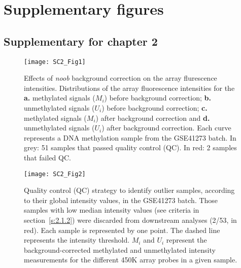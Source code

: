 
\setcounter{chapter}{-1}

\chapter[]{Supplementary figures} 

\ifpdf
\graphicspath{{Appendix/Figs/pdf/}}
\else
\graphicspath{{Appendix/Figs/svg/}}
\fi

\renewcommand{\thesection}{S.1}   
\section{Supplementary for chapter 2}

\renewcommand\thefigure{S1.\arabic{figure}}    

\begin{figure}[htbp!] 
	\centering    
	\setcounter{figure}{0}
	\texttt{[image: SC2\_Fig1]}
	\caption[Effects of \textit{noob} background correction on the array fluorescence intensities.]{Effects of \textit{noob} background correction on the array flurescence intensities. Distributions of the array fluorescence intensities for the \textbf{a.} methylated signals ($M_{i}$) before background correction; \textbf{b.} unmethylated signals ($U_{i}$) before background correction; \textbf{c.} methylated signals ($M_{i}$) after background correction and \textbf{d.} unmethylated signals ($U_{i}$) after background correction. Each curve represents a DNA methylation sample from the GSE41273 batch. In grey: 51 samples that passed quality control (QC). In red: 2 samples that failed QC.}
	\label{fig:sc2_fig1}
\end{figure}

\begin{figure}[htbp!] 
	\centering    
	\texttt{[image: SC2\_Fig2]}
	\caption[Quality control (QC) strategy to identify outlier samples.]{Quality control (QC) strategy to identify outlier samples, according to their global intensity values, in the GSE41273 batch. Those samples with low median intensity values (see criteria in section~\ref{s:2.1.2}) were discarded from downstream analyses (2/53, in red). Each sample is represented by one point. The dashed line represents the  intensity threshold. $M_{i}$ and $U_{i}$ represent the background-corrected methylated and unmethylated intensity measurements for the different 450K array probes in a given sample.}
	\label{fig:sc2_fig2}
\end{figure}

